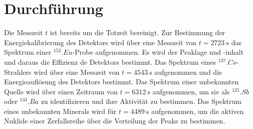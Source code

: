 \section{Durchführung}
\label{sec:Durchführung}
Die Messzeit $t$ ist bereits um die Totzeit bereinigt.
Zur Bestimmung der Energiekalibrierung des Detektors wird über eine Messzeit von $t=\SI{2723}{\second}$ das Spektrum einer $^{152}.{Eu}$-Probe aufgenommen.
Es wird der Peaklage und -inhalt und daraus die Effizienz de Detektors bestimmt.
Das Spektrum eines $^{137}.{Cs}$-Strahlers wird über eine Messzeit von $t=\SI{4543}{\second}$ aufgenommen und die Energieauflösung des Detektors bestimmt.
Das Spektrum einer unbekannten Quelle wird über einen Zeitraum von $t=\SI{6312}{\second}$ aufgenommen, um sie  als $^{125}.{Sb}$ oder $^{133}.{Ba}$ zu identifizieren und ihre Aktivität zu bestimmen.
Das Spektrum eines unbekannten Minerals wird für $t=\SI{4489}{\second} $ aufgenommen, um die aktiven Nuklide einer Zerfallsreihe über die Verteilung der Peaks zu bestimmen.


